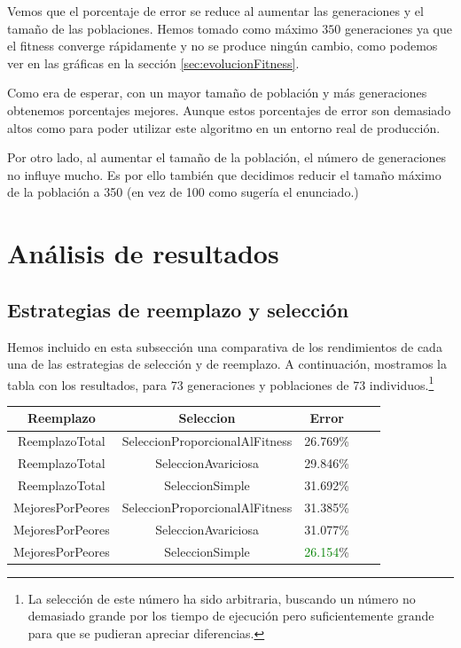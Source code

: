 \documentclass[nochap]{apuntes}
\begin{document}
Vemos que el porcentaje de error se reduce al aumentar las generaciones y el tamaño de las poblaciones. Hemos tomado como máximo $350$ generaciones ya que el fitness converge rápidamente y no se produce ningún cambio, como podemos ver en las gráficas en la sección \ref{sec:evolucionFitness}.

Como era de esperar, con un mayor tamaño de población y más generaciones obtenemos porcentajes mejores. Aunque estos porcentajes de error son demasiado altos como para poder utilizar este algoritmo en un entorno real de producción.

Por otro lado, al aumentar el tamaño de la población, el número de generaciones no influye mucho. Es por ello también que decidimos reducir el tamaño máximo de la población a 350 (en vez de 100 como sugería el enunciado.)

\section{Análisis de resultados}
\label{sec:Resultados}

\subsection{Estrategias de reemplazo y selección}

Hemos incluido en esta subsección una comparativa de los rendimientos de cada una de las estrategias de selección y de reemplazo. A continuación, mostramos la tabla con los resultados, para 73 generaciones y poblaciones de 73 individuos.\footnote{La selección de este número ha sido arbitraria, buscando un número no demasiado grande por los tiempo de ejecución pero suficientemente grande para que se pudieran apreciar diferencias.}


\begin{center}
\begin{tabular}{cccc|c}
Reemplazo & Seleccion   & Error\\\hline
ReemplazoTotal & SeleccionProporcionalAlFitness & 26.769\% \\
ReemplazoTotal & SeleccionAvariciosa & 29.846\% \\
ReemplazoTotal & SeleccionSimple & 31.692\% \\
MejoresPorPeores & SeleccionProporcionalAlFitness & 31.385\% \\
MejoresPorPeores & SeleccionAvariciosa & 31.077\% \\
MejoresPorPeores & SeleccionSimple & \textcolor{green}{26.154}\% \\
\end{tabular}
\end{center}
\end{document}
